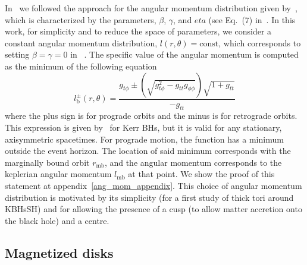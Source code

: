 \documentclass[twocolumn,aps,showpacs,showkeys,prd,superscriptaddress,byrevtex, amsmath]{revtex4-1}
\begin{document}
In~\cite{Gimeno-Soler:2017} we followed the approach for the angular momentum distribution given by~\cite{Qian:2009}, which is characterized by the parameters, $\beta$, $\gamma$, and $eta$ (see Eq.~(7) in~\cite{Gimeno-Soler:2017}. In this work, for simplicity and to reduce the space of parameters, we consider a constant angular momentum distribution, $l(r,\theta) = \mathrm{const}$, which corresponds to setting $\beta=\gamma=0$ in ~\cite{Gimeno-Soler:2017}.   The specific value of the angular momentum is computed as the minimum of the following equation
\begin{equation}\label{eq:mb_ang_mom}
l^{\pm}_{\mathrm{b}}(r, \theta) = \frac{g_{t\phi}\pm\left(\sqrt{g_{t\phi}^2-g_{tt}g_{\phi\phi}}\right)\sqrt{1+g_{tt}}}{-g_{tt}}
\end{equation}
where the plus sign is for prograde orbits and the minus is for retrograde orbits.
This expression is given by~\citep{Daigne:2004} for Kerr BHs, but it is valid for any stationary, axisymmetric spacetimes. For prograde motion, the function has a minimum outside the event horizon. The location of said minimum corresponds with the marginally bound orbit $r_{\mathrm{mb}}$, and the angular momentum corresponds to the keplerian angular momentum $l_{\mathrm{mb}}$ at that point. We show the proof of this statement at appendix~\ref{ang_mom_appendix}. This choice of angular momentum distribution is motivated by its simplicity (for a first study of thick tori around KBHsSH) and for allowing the presence of a cusp (to allow matter accretion onto the black hole) and a centre.

\subsection{Magnetized disks}
\end{document}
